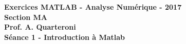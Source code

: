 \begin{center}
  \textbf{Exercices \textsc{MATLAB} - Analyse Numérique - 2017 \\
  Section MA \\
  Prof. A. Quarteroni \\
  Séance 1 - Introduction à Matlab}
\end{center}


\vspace{10mm}

\begin{ex}

\end{ex}

\begin{ex}

\end{ex}

\begin{ex}

\end{ex}

\begin{ex}

\end{ex}

\begin{ex}

\end{ex}
